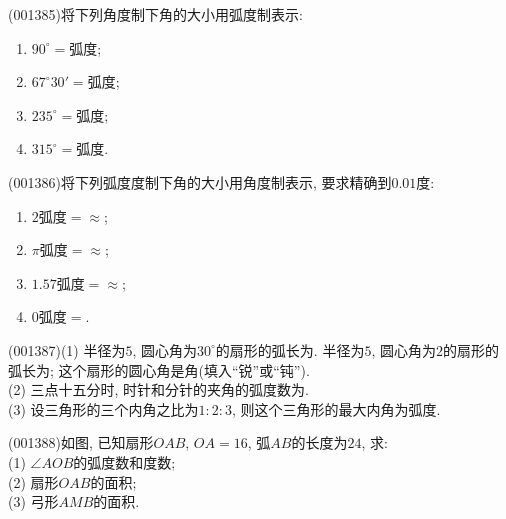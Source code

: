\item (001385)将下列角度制下角的大小用弧度制表示:
\begin{enumerate}[(1)]
\item $90^\circ=$弧度;\\ 
\item $67^\circ 30'=$弧度;\\ 
\item $235^\circ=$弧度;\\ 
\item $315^\circ=$弧度.\\ 
\end{enumerate}
\item (001386)将下列弧度度制下角的大小用角度制表示, 要求精确到$0.01$度:
\begin{enumerate}[(1)]
\item $2$弧度$=$$\approx$;\\ 
\item $\pi$弧度$=$$\approx$;\\ 
\item $1.57$弧度$=$$\approx$;\\ 
\item $0$弧度$=$.
\end{enumerate}
\item (001387)(1) 半径为$5$, 圆心角为$30^\circ$的扇形的弧长为. 半径为$5$, 圆心角为$2$的扇形的弧长为; 这个扇形的圆心角是角(填入``锐''或``钝'').\\ 
(2)  三点十五分时, 时针和分针的夹角的弧度数为.\\ 
(3)  设三角形的三个内角之比为$1:2:3$, 则这个三角形的最大内角为弧度.
\item (001388)如图, 已知扇形$OAB$, $OA=16$, 弧$AB$的长度为$24$, 求:\\ 
(1) $\angle AOB$的弧度数和度数;\\ 
(2) 扇形$OAB$的面积;\\ 
(3) 弓形$AMB$的面积.
\begin{center}
\end{center}

